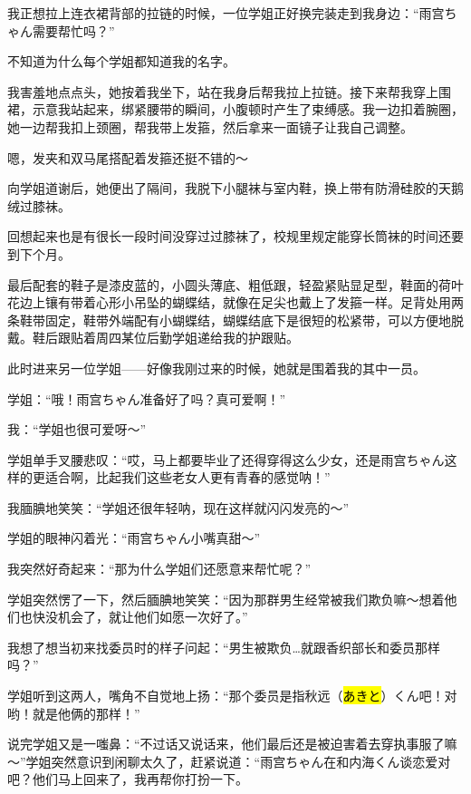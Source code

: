 我正想拉上连衣裙背部的拉链的时候，一位学姐正好换完装走到我身边：“雨宫ちゃん需要帮忙吗？”

不知道为什么每个学姐都知道我的名字。

我害羞地点点头，她按着我坐下，站在我身后帮我拉上拉链。接下来帮我穿上围裙，示意我站起来，绑紧腰带的瞬间，小腹顿时产生了束缚感。我一边扣着腕圈，她一边帮我扣上颈圈，帮我带上发箍，然后拿来一面镜子让我自己调整。

嗯，发夹和双马尾搭配着发箍还挺不错的～

向学姐道谢后，她便出了隔间，我脱下小腿袜与室内鞋，换上带有防滑硅胶的天鹅绒过膝袜。

回想起来也是有很长一段时间没穿过过膝袜了，校规里规定能穿长筒袜的时间还要到下个月。

最后配套的鞋子是漆皮蓝的，小圆头薄底、粗低跟，轻盈紧贴显足型，鞋面的荷叶花边上镶有带着心形小吊坠的蝴蝶结，就像在足尖也戴上了发箍一样。足背处用两条鞋带固定，鞋带外端配有小蝴蝶结，蝴蝶结底下是很短的松紧带，可以方便地脱戴。鞋后跟贴着周四某位后勤学姐递给我的护跟贴。

此时进来另一位学姐——好像我刚过来的时候，她就是围着我的其中一员。

学姐：“哦！雨宫ちゃん准备好了吗？真可爱啊！”

我：“学姐也很可爱呀～”

学姐单手叉腰悲叹：“哎，马上都要毕业了还得穿得这么少女，还是雨宫ちゃん这样的更适合啊，比起我们这些老女人更有青春的感觉呐！”



我腼腆地笑笑：“学姐还很年轻呐，现在这样就闪闪发亮的～”

学姐的眼神闪着光：“雨宫ちゃん小嘴真甜～”

我突然好奇起来：“那为什么学姐们还愿意来帮忙呢？”

学姐突然愣了一下，然后腼腆地笑笑：“因为那群男生经常被我们欺负嘛～想着他们也快没机会了，就让他们如愿一次好了。”

我想了想当初来找委员时的样子问起：“男生被欺负…就跟香织部长和委员那样吗？”

学姐听到这两人，嘴角不自觉地上扬：“那个委员是指秋远（\hl{あきと}）くん吧！对哟！就是他俩的那样！”

%

说完学姐又是一嗤鼻：“不过话又说话来，他们最后还是被迫害着去穿执事服了嘛～”学姐突然意识到闲聊太久了，赶紧说道：“雨宫ちゃん在和内海くん谈恋爱对吧？他们马上回来了，我再帮你打扮一下。

